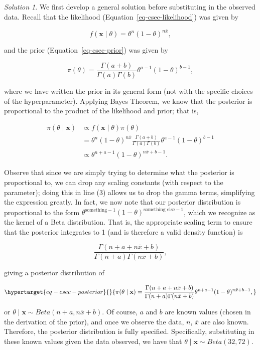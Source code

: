\documentclass[
  letterpaper,
  DIV=11,
  numbers=noendperiod]{scrreprt}
\theoremstyle{definition}
\theoremstyle{definition}
\theoremstyle{plain}
\theoremstyle{remark}
\newtheorem*{solution}{Solution}
\begin{document}
\begin{solution}

We first develop a general solution before substituting in the observed
data. Recall that the likelihood (Equation~\ref{eq-csec-likelihood}) was
given by

\[f(\mathbf{x} \mid \theta) = \theta^n (1 - \theta)^{n \bar{x}},\]

and the prior (Equation~\ref{eq-csec-prior}) was given by

\[\pi(\theta) = \frac{\Gamma(a+b)}{\Gamma(a) \Gamma(b)} \theta^{a-1} (1 - \theta)^{b-1},\]

where we have written the prior in its general form (not with the
specific choices of the hyperparameter). Applying Bayes Theorem, we know
that the posterior is proportional to the product of the likelihood and
prior; that is,

\[
\begin{aligned}
  \pi(\theta \mid \mathbf{x}) 
    &\propto f(\mathbf{x} \mid \theta) \pi(\theta) \\
    &= \theta^n (1 - \theta)^{n \bar{x}} \frac{\Gamma(a + b)}{\Gamma(a) \Gamma(b)} \theta^{a-1} (1 - \theta)^{b - 1} \\
    &\propto \theta^{n + a - 1} (1 - \theta)^{n\bar{x} + b - 1}.
\end{aligned}
\]

Observe that since we are simply trying to determine what the posterior
is proportional to, we can drop any scaling constants (with respect to
the parameter); doing this in line (3) allows us to drop the gamma
terms, simplifying the expression greatly. In fact, we now note that our
posterior distribution is proportional to the form
\(\theta^{\text{something} - 1} (1 - \theta)^{\text{something else} - 1}\),
which we recognize as the kernel of a Beta distribution. That is, the
appropriate scaling term to ensure that the posterior integrates to 1
(and is therefore a valid density function) is

\[\frac{\Gamma(n + a + n\bar{x} + b)}{\Gamma(n + a)\Gamma(n\bar{x} + b)},\]

giving a posterior distribution of

\begin{equation}\protect\hypertarget{eq-csec-posterior}{}{\pi(\theta \mid \mathbf{x}) = \frac{\Gamma(n + a + n\bar{x} + b)}{\Gamma(n + a)\Gamma(n\bar{x} + b)} \theta^{n + a - 1} (1 - \theta)^{n\bar{x} + b - 1},}\label{eq-csec-posterior}\end{equation}

or \(\theta \mid \mathbf{x} \sim Beta(n + a, n\bar{x} + b)\). Of course,
\(a\) and \(b\) are known values (chosen in the derivation of the
prior), and once we observe the data, \(n\), \(\bar{x}\) are also known.
Therefore, the posterior distribution is fully specified. Specifically,
substituting in these known values given the data observed, we have that
\(\theta \mid \mathbf{x} \sim Beta(32, 72)\).

\end{solution}
\end{document}
